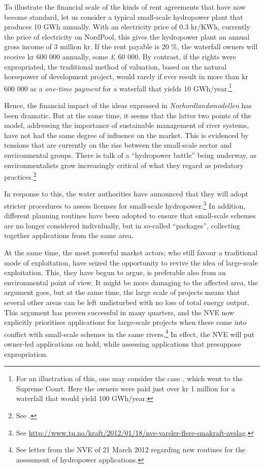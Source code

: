 To illustrate the financial scale of the kinds of rent agreements that have now become standard, let us consider a typical small-scale hydropower plant that produces 10 GWh annually. With an electricity price of 0.3 kr/KWh, currently the price of electricity on NordPool, this gives the hydropower plant an annual gross income of 3 million kr. If the rent payable is 20 \%, the waterfall owners will receive kr 600 000 annually, some £ 60 000. By contrast, if the rights were expropriated, the traditional method of valuation, based on the natural horsepower of development project, would rarely if ever result in more than kr 600 000 as a {\it one-time payment} for a waterfall that yields 10 GWh/year.\footnote{For an illustration of this, one may consider the case \cite{hellandsfoss97}, which went to the Supreme Court. Here the owners were paid just over kr 1 million for a waterfall that would yield 100 GWh/year.}

Hence, the financial impact of the ideas expressed in {\it Norhordlandsmodellen} has been dramatic. But at the same time, it seems that the latter two points of the model, addressing the importance of sustainable management of river systems, have not had the same degree of influence on the market. This is evidenced by tensions that are currently on the rise between the small-scale sector and environmental groups. There is talk of a ``hydropower battle'' being underway, as environmentalists grow increasingly critical of what they regard as predatory practices.\footnote{See \cite{haltbrekken12}.}

In response to this, the water authorities have announced that they will adopt stricter procedures to assess licenses for small-scale hydropower.\footnote{See \url{http://www.tu.no/kraft/2012/01/18/nve-varsler-flere-smakraft-avslag}.} In addition, different planning routines have been adopted to ensure that small-scale schemes are no longer considered individually, but in so-called ``packages'', collecting together applications from the same area.

At the same time, the most powerful market actors, who still favour a traditional mode of exploitation, have seized the opportunity to revive the idea of large-scale exploitation. This, they have begun to argue, is preferable also from an environmental point of view. It might be more damaging to the affected area, the argument goes, but at the same time, the large scale of projects means that several other areas can be left undisturbed with no loss of total energy output. This argument has proven successful in many quarters, and the NVE now explicitly prioritises applications for large-scale projects when these come into conflict with small-scale schemes in the same rivers.\footnote{See letter from the NVE of 21 March 2012 regarding new routines for the assessment of hydropower applications.}
In effect, the NVE will put owner-led applications on hold, while assessing applications that presuppose expropriation.


